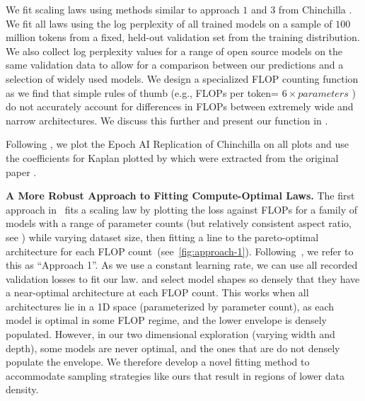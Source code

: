 \documentclass{article}
\begin{document}
We fit scaling laws using methods similar to approach \(1\) and \(3\) from Chinchilla \citep{hoffmann2022empirical}.
We fit all laws using the log perplexity of all trained models on a sample of \(100\) million tokens from a fixed, held-out validation set from the training distribution.
We also collect log perplexity values for a range of open source models \citep{team2024gemma1, team2024gemma2, touvron2023llama2, dubey2024llama, yang2024qwen2, yang2024qwen25} on the same validation data to allow for a comparison between our predictions and a selection of widely used models.
We design a specialized FLOP counting function as we find that simple rules of thumb (e.g., FLOPs per token= \(6 \times parameters\) \citep{hoffmann2022empirical}) do not accurately account for differences in FLOPs between extremely wide and narrow architectures.
We discuss this further and present our function in .

Following \citet{porian2024resolving}, we plot the Epoch AI Replication \citep{besiroglu2024chinchilla} of Chinchilla \citep{hoffmann2022empirical} on all plots and use the coefficients for Kaplan plotted by \citet{porian2024resolving} which were extracted from the original paper \citep{kaplan2020scaling}.

\noindent \textbf{A More Robust Approach to Fitting Compute-Optimal Laws.}
The first approach in~\citet{hoffmann2022empirical} fits a scaling law by plotting the loss against FLOPs for a family of models with a range of parameter counts (but relatively consistent aspect ratio, see ) while varying dataset size, then fitting a line to the pareto-optimal architecture for each FLOP count~(see~\cref{fig:approach-1}).
Following~\citet{hoffmann2022empirical}, we refer to this as ``Approach 1''.
As we use a constant learning rate, we can use all recorded validation losses to fit our law.
\citet{hoffmann2022empirical} and \citet{kaplan2020scaling} select model shapes so densely that they have a near-optimal architecture at each FLOP count.  This works when all architectures lie in a 1D space (parameterized by parameter count), as each model is optimal in some FLOP regime, and the lower envelope is densely populated. However, in our two dimensional exploration (varying width and depth), some models are never optimal, and the ones that are do not densely populate the envelope.
We therefore develop a novel fitting method to accommodate sampling strategies like ours that result in regions of lower data density.
\end{document}
